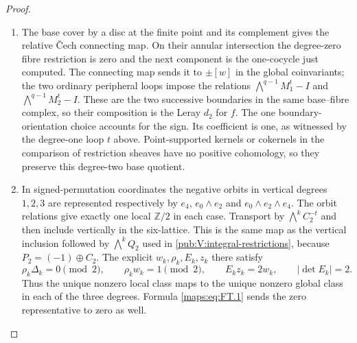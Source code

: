 \documentclass[11pt,a4paper]{article}
\numberwithin{equation}{section}
\theoremstyle{definition}
\begin{document}
\begin{proof}
\begin{enumerate}[label=\arabic*.]
\item The base cover by a disc at the finite point and its
complement gives the relative \v{C}ech connecting map.  On their
annular intersection the degree-zero fibre restriction is zero and
the next component is the one-cocycle just computed.
The connecting map sends it to $\pm[w]$ in the global coinvariants;
the two ordinary peripheral loops impose the relations
$\bigwedge^{q-1}M_1^t-I$ and $\bigwedge^{q-1}M_2^t-I$.
These are the two successive boundaries in the same base--fibre
complex, so their composition is the Leray $d_2$ for $f$.  The one boundary-orientation choice accounts
for the sign.  Its coefficient is one, as witnessed by the
degree-one loop $t$ above.  Point-supported kernels or cokernels in
the comparison of restriction sheaves have no positive cohomology,
so they preserve this degree-two base quotient.

\item In signed-permutation coordinates the negative orbits in
vertical degrees $1,2,3$ are represented respectively by
$e_4$, $e_0\wedge e_2$ and $e_0\wedge e_2\wedge e_4$.
The orbit relations give exactly one local $\mathbb Z/2$ in each
case.  Transport by $\bigwedge^kC_2^{-t}$ and then include vertically
in the six-lattice.  This is the same map as the vertical inclusion
followed by $\bigwedge^kQ_2$ used in
\cref{pub:V:integral-restrictions}, because $P_2=(-1)\oplus C_2$.
The explicit $w_k,\rho_k,E_k,z_k$ there satisfy
\[
 \rho_k\Delta_k=0\pmod2,\qquad
 \rho_kw_k=1\pmod2,\qquad E_kz_k=2w_k,
 \qquad |\det E_k|=2.
\]
Thus the unique nonzero local class maps to the unique nonzero
global class in each of the three degrees.  Formula
\eqref{maps:eq:FT.1} sends the zero representative to zero as well.
\end{enumerate}
\end{proof}
\end{document}
